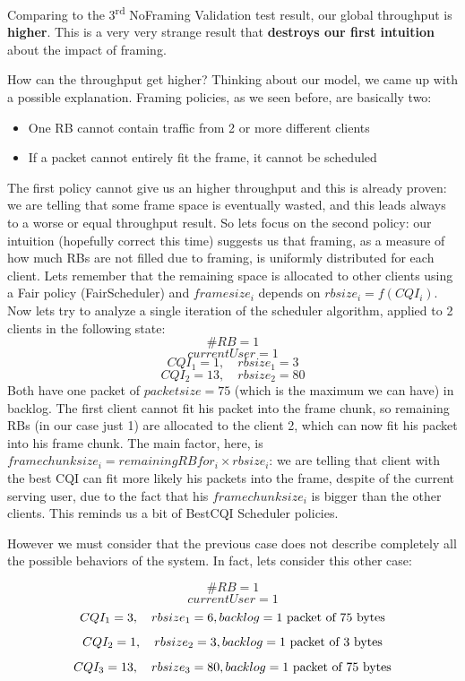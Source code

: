 Comparing to the 3\textsuperscript{rd} NoFraming Validation test result, our global throughput is \textbf{higher}. This is a very very strange result that \textbf{destroys our first intuition} about the impact of framing.

How can the throughput get higher? Thinking about our model, we came up with a possible explanation. Framing policies, as we seen before, are basically two:
\begin{itemize}
	\item One RB cannot contain traffic from 2 or more different clients
	\item If a packet cannot entirely fit the frame, it cannot be scheduled
\end{itemize}
The first policy cannot give us an higher throughput and this is already proven: we are telling that some frame space is eventually wasted, and this leads always to a worse or equal throughput result. So lets focus on the second policy: our intuition (hopefully correct this time) suggests us that framing, as a measure of how much RBs are not filled due to framing, is uniformly distributed for each client. Lets remember that the remaining space is allocated to other clients using a Fair policy (FairScheduler) and \(framesize_i\) depends on \(rbsize_i = f(CQI_i)\). Now lets try to analyze a single iteration of the scheduler algorithm, applied to 2 clients in the following state:
\[\#RB = 1\]
\[currentUser = 1\]
\[CQI_1 = 1, \quad rbsize_1 = 3\]
\[CQI_2 = 13, \quad rbsize_2 = 80\]
Both have one packet of \(packetsize=75\) (which is the maximum we can have) in backlog. The first client cannot fit his packet into the frame chunk, so remaining RBs (in our case just 1) are allocated to the client 2, which can now fit his packet into his frame chunk. The main factor, here, is \(framechunksize_i = remainingRBfor_i \times rbsize_i\): we are telling that client with the best CQI can fit more likely his packets into the frame, despite of the current serving user, due to the fact that his \(framechunksize_i\) is bigger than the other clients. This reminds us a bit of BestCQI Scheduler policies.

However we must consider that the previous case does not describe completely all the possible behaviors of the system. In fact, lets consider this other case:

\[\#RB = 1\]
\[currentUser = 1\]
\[CQI_1 = 3, \quad rbsize_1 = 6, backlog = \textnormal{1 packet of 75 bytes}\]
\[CQI_2 = 1, \quad rbsize_2 = 3, backlog = \textnormal{1 packet of 3 bytes}\]
\[CQI_3 = 13, \quad rbsize_3 = 80, backlog = \textnormal{1 packet of 75 bytes}\]

